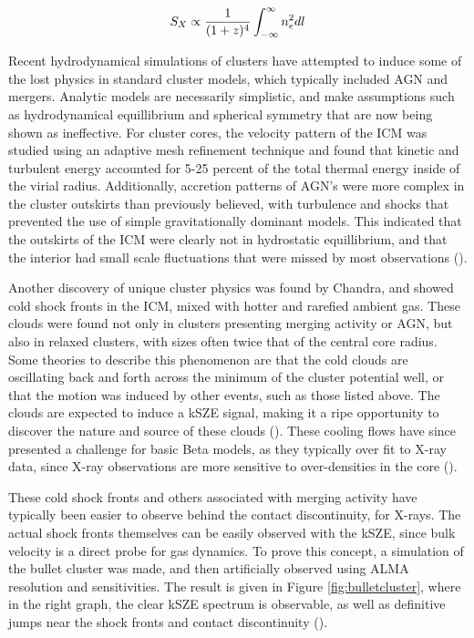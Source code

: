 \documentclass[manuscript]{aastex}
\begin{document}
\begin{equation}\label{eq:xraydim}
S_{X} \propto \frac{1}{(1+z)^4} \Large\int^{\infty}_{-\infty}  n_{e}^{2} dl
\end{equation}

Recent hydrodynamical simulations of clusters have attempted to induce some of the lost physics in standard cluster models, which typically included AGN and mergers. Analytic models are necessarily simplistic,  and make assumptions such as hydrodynamical equillibrium and spherical symmetry that are now being shown as ineffective. For cluster cores, the velocity pattern of the ICM was studied using an adaptive mesh refinement technique and found that kinetic and turbulent energy accounted for 5-25 percent of the total thermal energy inside of the virial radius. Additionally, accretion patterns of AGN's were more complex in the cluster outskirts than previously believed, with turbulence and shocks that prevented the use of simple gravitationally dominant models. This indicated that the outskirts of the ICM were clearly not in hydrostatic equillibrium, and that the interior had small scale fluctuations that were missed by most observations (\cite{Reiprich2013}).  

Another discovery of unique cluster physics was found by Chandra, and showed cold shock fronts in the ICM, mixed with hotter and rarefied ambient gas. These clouds were found not only in clusters presenting merging activity or AGN, but also in relaxed clusters, with sizes often twice that of the central core radius. Some theories to describe this phenomenon are that the cold clouds are oscillating back and forth across the minimum of the cluster potential well, or that the motion was induced by other events, such as those listed above. The clouds are expected to induce a kSZE signal, making it a ripe opportunity to discover the nature and source of these clouds (\cite{Diego2003}). These cooling flows have since presented a challenge for basic Beta models, as they typically over fit to X-ray data, since X-ray observations are more sensitive to over-densities in the core (\cite{Benson2003}). 

These cold shock fronts and others associated with merging activity have typically been easier to observe behind the contact discontinuity, for X-rays. The actual shock fronts themselves can be easily observed with the kSZE, since bulk velocity is a direct probe for gas dynamics. To prove this concept, a simulation of the bullet cluster was made, and then artificially observed using ALMA resolution and sensitivities. The result is given in Figure \ref{fig:bulletcluster}, where in the right graph, the clear kSZE spectrum is observable, as well as definitive jumps near the shock fronts and contact discontinuity (\cite{Kitayama2014}). 
\end{document}
